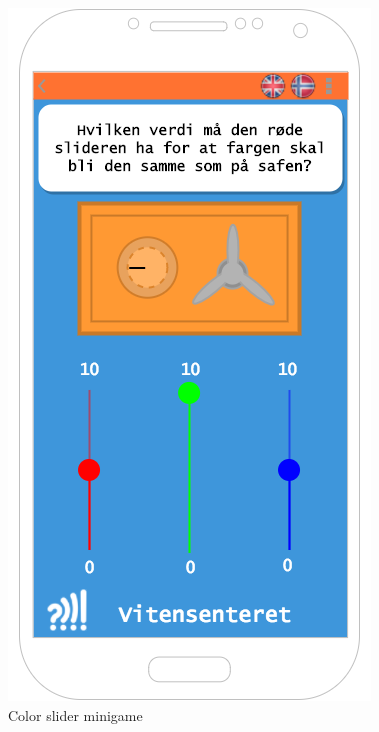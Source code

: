 \begin{figure}[H]
  \begin{minipage}[b]{0.35\textwidth}
    \includegraphics[width=\textwidth]{images/sketches/ColorSlider.png}
    \caption{Color slider minigame}
  \end{minipage}
  \hfill
  \begin{minipage}[b]{0.33\textwidth}

\end{minipage}
\end{figure}
